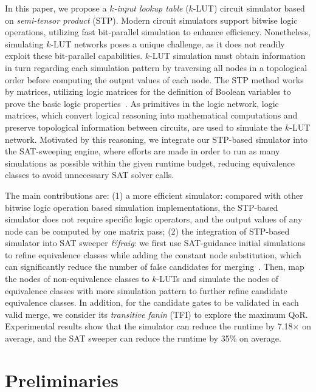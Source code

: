 \documentclass[conference]{IEEEtran}
\begin{document}
In this paper, we propose a \emph{$k$-input lookup table} ($k$-LUT) circuit simulator based on \emph{semi-tensor product} (STP).
Modern circuit simulators support bitwise logic operations, utilizing fast bit-parallel simulation to enhance efficiency. 
Nonetheless, simulating $k$-LUT networks poses a unique challenge, as it does not readily exploit these bit-parallel capabilities. 
$k$-LUT simulation must obtain information in turn regarding each simulation pattern by traversing all nodes in a topological order before computing the output values of each node.
The STP method works by matrices, utilizing logic matrices for the definition of Boolean variables to prove the basic logic properties~\cite{intro6}. 
As primitives in the logic network, logic matrices, which convert logical reasoning into mathematical computations and preserve topological information between circuits, are used to simulate the $k$-LUT network.
Motivated by this reasoning, we integrate our STP-based simulator into the SAT-sweeping engine, where efforts are made in order to run as many simulations as possible within the given runtime budget, reducing equivalence classes to avoid unnecessary SAT solver calls.

The main contributions are: (1) a more efficient simulator: compared with other bitwise logic operation based simulation implementations, the STP-based simulator does not require specific logic operators, and the output values of any node can be computed by one matrix pass; 
(2) the integration of STP-based simulator into SAT sweeper \emph{\&fraig}: we first use SAT-guidance initial simulations to refine equivalence classes while adding the constant node substitution, which can significantly reduce the number of false candidates for merging~\cite{intro7}.
Then, map the nodes of non-equivalence classes to $k$-LUTs and simulate the nodes of equivalence classes with more simulation pattern to further refine candidate equivalence classes.
In addition, for the candidate gates to be validated in each valid merge, we consider its \emph{transitive fanin} (TFI) to explore the maximum QoR.
Experimental results show that the simulator can reduce the runtime by 7.18$\times$ on average, and the SAT sweeper can reduce the runtime by 35\% on average.

\vspace{-2mm}
\section{Preliminaries}
\label{sec2}
\end{document}
